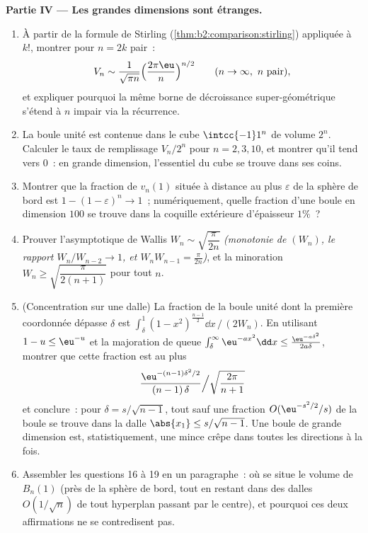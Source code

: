 \begin{problem}[{Problème du week-end --- $V_n =
\pi^{n/2}/\Gamma(\frac n2 + 1)$, et l'étrangeté des grandes
dimensions}]
\medskip
\noindent\textbf{Partie IV --- Les grandes dimensions sont étranges.}
\begin{enumerate}[resume]
  \item À partir de la formule de Stirling
        (\cref{thm:b2:comparison:stirling}) appliquée à $k!$,
        montrer pour $n = 2k$ pair~:
        \[
        V_n \sim \frac{1}{\sqrt{\pi n}}
        \Bigl(\frac{2\pi\eu}{n}\Bigr)^{n/2}
        \qquad (n \to \infty, \ n \text{ pair}),
        \]
        et expliquer pourquoi la même borne de décroissance
        super-géométrique s'étend à $n$ impair via la récurrence.
  \item La boule unité est contenue dans le cube $\intcc{-1}1^n$ de
        volume $2^n$. Calculer le taux de remplissage $V_n/2^n$ pour
        $n = 2, 3, 10$, et montrer qu'il tend vers $0$~: en grande
        dimension, l'essentiel du cube se trouve dans ses coins.
  \item Montrer que la fraction de $v_n(1)$ située à
        distance au plus $\varepsilon$ de la sphère de bord est $1 -
        (1 - \varepsilon)^n \to 1$~; numériquement, quelle
        fraction d'une boule en dimension $100$ se trouve dans la
        coquille extérieure d'épaisseur $1\%$~?
  \item Prouver l'asymptotique de Wallis $W_n \sim
        \sqrt{\dfrac{\pi}{2n}}$ \emph{(monotonie de
        $(W_n)$, le rapport $W_n/W_{n-2} \to 1$, et $W_nW_{n-1}
        = \frac\pi{2n}$)}, et la minoration $W_n \geq
        \sqrt{\dfrac{\pi}{2(n+1)}}$ pour tout $n$.
  \item (Concentration sur une dalle) La fraction de la boule
        unité dont la première coordonnée dépasse $\delta$ est
        $\int_\delta^1(1 - x^2)^{\frac{n-1}2}\dd x \,\big/\,
        (2W_n)$. En utilisant $1 - u \leq \eu^{-u}$ et la
        majoration de queue $\int_\delta^\infty \eu^{-a x^2}\dd x \leq
        \frac{\eu^{-a\delta^2}}{2a\delta}$, montrer que cette
        fraction est au plus
        \[
        \frac{\eu^{-(n-1)\delta^2/2}}{(n-1)\,\delta}
        \Big/ \sqrt{\frac{2\pi}{n+1}}
        \]
        et conclure~: pour $\delta = s/\sqrt{n-1}$, tout sauf une
        fraction $O(\eu^{-s^2/2}/s)$ de la boule se trouve dans la
        dalle $\abs{x_1} \leq s/\sqrt{n-1}$. Une boule de grande
        dimension est, statistiquement, une mince crêpe dans toutes
        les directions à la fois.
  \item Assembler les questions 16 à 19 en un paragraphe~: où
        se situe le volume de $B_n(1)$ (près de la sphère de bord,
        tout en restant dans des dalles $O(1/\sqrt n)$ de tout
        hyperplan passant par le centre), et pourquoi ces deux
        affirmations ne se contredisent pas.
\end{enumerate}


\end{problem}
